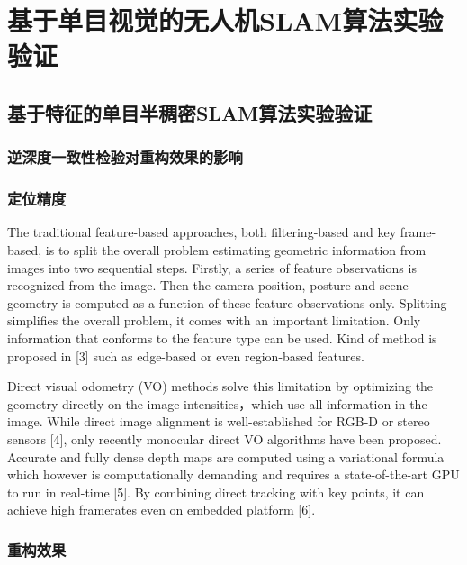 
\chapter{基于单目视觉的无人机SLAM算法实验验证}
\label{chap:Experiment}


\section{基于特征的单目半稠密SLAM算法实验验证}

\subsection{逆深度一致性检验对重构效果的影响}

\subsection{定位精度}
The traditional feature-based approaches, both filtering-based and key frame-based, is to split the overall problem estimating geometric information from images into two sequential steps. Firstly, a series of feature observations is recognized from the image. Then the camera position, posture and scene geometry is computed as a function of these feature observations only. Splitting simplifies the overall problem, it comes with an important limitation. Only information that conforms to the feature type can be used. Kind of method is proposed in [3] such as edge-based or even region-based features.

Direct visual odometry (VO) methods solve this limitation by optimizing the geometry directly on the image intensities，which use all information in the image. While direct image alignment is well-established for RGB-D or stereo sensors [4], only recently monocular direct VO algorithms have been proposed. Accurate and fully dense depth maps are computed using a variational formula which however is computationally demanding and requires a state-of-the-art GPU to run in real-time [5]. By combining direct tracking with key points, it can achieve high framerates even on embedded platform [6].

\subsection{重构效果}

